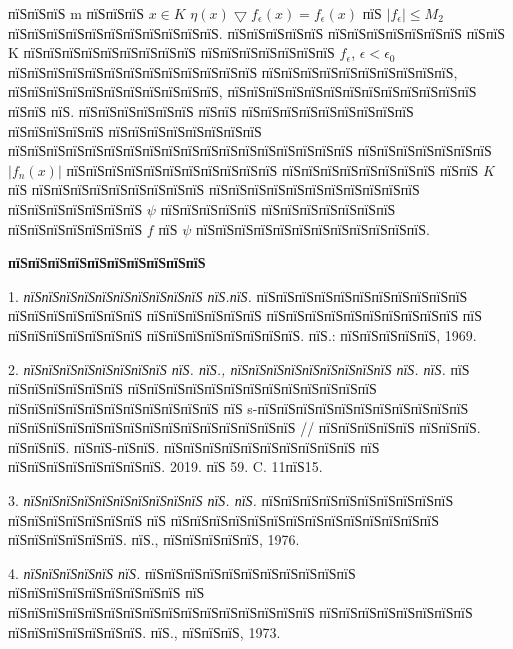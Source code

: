 \documentclass[a5paper, 12pt, openbib]{report}
\begin{document}
 пїЅпїЅпїЅ m 
пїЅпїЅпїЅ  $x\in K$ $\eta(x)\bigtriangledown f_{\epsilon}(x)=f_{\epsilon}(x)$   пїЅ $|f_\epsilon|\leq M_2$  пїЅпїЅпїЅпїЅпїЅпїЅпїЅпїЅпїЅпїЅпїЅ.
пїЅпїЅпїЅпїЅпїЅ пїЅпїЅпїЅпїЅпїЅпїЅпїЅ пїЅпїЅ K пїЅпїЅпїЅпїЅпїЅпїЅпїЅпїЅпїЅ пїЅпїЅпїЅпїЅпїЅпїЅпїЅ $f_\epsilon$, $\epsilon<\epsilon_0$   пїЅпїЅпїЅпїЅпїЅпїЅпїЅпїЅпїЅпїЅпїЅпїЅпїЅ пїЅпїЅпїЅпїЅпїЅпїЅпїЅпїЅпїЅпїЅ, пїЅпїЅпїЅпїЅпїЅпїЅпїЅпїЅпїЅпїЅпїЅ, пїЅпїЅпїЅпїЅпїЅпїЅпїЅпїЅпїЅпїЅпїЅпїЅпїЅ пїЅпїЅ пїЅ. пїЅпїЅпїЅпїЅпїЅпїЅ пїЅпїЅ пїЅпїЅпїЅпїЅпїЅпїЅпїЅпїЅпїЅ пїЅпїЅпїЅпїЅпїЅ пїЅпїЅпїЅпїЅпїЅпїЅпїЅпїЅ пїЅпїЅпїЅпїЅпїЅпїЅпїЅпїЅпїЅпїЅпїЅпїЅпїЅпїЅпїЅпїЅпїЅпїЅ пїЅпїЅпїЅпїЅпїЅпїЅпїЅ $|f_{n}(x)|$  пїЅпїЅпїЅпїЅпїЅпїЅпїЅпїЅпїЅпїЅпїЅ пїЅпїЅпїЅпїЅпїЅпїЅпїЅпїЅ пїЅпїЅ $K$ пїЅ пїЅпїЅпїЅпїЅпїЅпїЅпїЅпїЅпїЅ пїЅпїЅпїЅпїЅпїЅпїЅпїЅпїЅпїЅпїЅпїЅ пїЅпїЅпїЅпїЅпїЅпїЅпїЅ $\psi$ пїЅпїЅпїЅпїЅпїЅ пїЅпїЅпїЅпїЅпїЅпїЅпїЅ пїЅпїЅпїЅпїЅпїЅпїЅпїЅ $f$ пїЅ $\psi$ пїЅпїЅпїЅпїЅпїЅпїЅпїЅпїЅпїЅпїЅпїЅпїЅ.

\smallskip \centerline {\bf пїЅпїЅпїЅпїЅпїЅпїЅпїЅпїЅпїЅпїЅ} \nopagebreak

1. {\it пїЅпїЅпїЅпїЅпїЅпїЅпїЅпїЅпїЅпїЅ пїЅ.пїЅ.} пїЅпїЅпїЅпїЅпїЅпїЅпїЅпїЅпїЅпїЅпїЅ пїЅпїЅпїЅпїЅпїЅпїЅпїЅ пїЅпїЅпїЅпїЅпїЅпїЅ пїЅпїЅпїЅпїЅпїЅпїЅпїЅпїЅпїЅпїЅ пїЅ пїЅпїЅпїЅпїЅпїЅпїЅпїЅ пїЅпїЅпїЅпїЅпїЅпїЅпїЅпїЅ. пїЅ.: пїЅпїЅпїЅпїЅпїЅ, 1969.

2. {\it пїЅпїЅпїЅпїЅпїЅпїЅпїЅпїЅ пїЅ. пїЅ., пїЅпїЅпїЅпїЅпїЅпїЅпїЅпїЅпїЅ пїЅ. пїЅ.}  пїЅ пїЅпїЅпїЅпїЅпїЅпїЅ пїЅпїЅпїЅпїЅпїЅпїЅпїЅпїЅпїЅпїЅпїЅпїЅпїЅ пїЅпїЅпїЅпїЅпїЅпїЅпїЅпїЅпїЅпїЅпїЅ пїЅ s-пїЅпїЅпїЅпїЅпїЅпїЅпїЅпїЅпїЅпїЅпїЅ пїЅпїЅпїЅпїЅпїЅпїЅпїЅпїЅпїЅпїЅпїЅпїЅпїЅпїЅпїЅ // пїЅпїЅпїЅпїЅпїЅ пїЅпїЅпїЅ. пїЅпїЅпїЅ. пїЅпїЅ-пїЅпїЅ. пїЅпїЅпїЅпїЅпїЅпїЅпїЅпїЅпїЅпїЅ пїЅ пїЅпїЅпїЅпїЅпїЅпїЅпїЅпїЅ. 2019. пїЅ 59. C. 11пїЅ15.

3. {\it пїЅпїЅпїЅпїЅпїЅпїЅпїЅпїЅпїЅпїЅ пїЅ. пїЅ.} пїЅпїЅпїЅпїЅпїЅпїЅпїЅпїЅпїЅпїЅ пїЅпїЅпїЅпїЅпїЅпїЅпїЅ пїЅ пїЅпїЅпїЅпїЅпїЅпїЅпїЅпїЅпїЅпїЅпїЅпїЅпїЅпїЅ пїЅпїЅпїЅпїЅпїЅпїЅ. пїЅ., пїЅпїЅпїЅпїЅпїЅ, 1976.

4. {\it пїЅпїЅпїЅпїЅпїЅ пїЅ.} пїЅпїЅпїЅпїЅпїЅпїЅпїЅпїЅпїЅпїЅпїЅ пїЅпїЅпїЅпїЅпїЅпїЅпїЅпїЅпїЅ пїЅ пїЅпїЅпїЅпїЅпїЅпїЅпїЅпїЅпїЅпїЅпїЅпїЅпїЅпїЅпїЅпїЅ пїЅпїЅпїЅпїЅпїЅпїЅпїЅпїЅ пїЅпїЅпїЅпїЅпїЅпїЅпїЅ. пїЅ., пїЅпїЅпїЅ, 1973.
\end{document}
